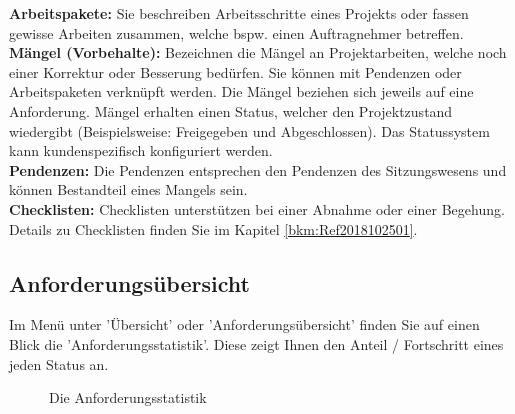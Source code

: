 \textbf{Arbeitspakete:} Sie beschreiben Arbeitsschritte eines Projekts oder fassen gewisse Arbeiten zusammen, welche bspw. einen Auftragnehmer betreffen. \\

\textbf{Mängel (Vorbehalte):} Bezeichnen die Mängel an Projektarbeiten, welche noch einer Korrektur oder Besserung bedürfen. Sie können mit Pendenzen oder Arbeitspaketen verknüpft werden. Die Mängel beziehen sich jeweils auf eine Anforderung. Mängel erhalten einen Status, welcher den Projektzustand wiedergibt (Beispielsweise: Freigegeben und Abgeschlossen). Das Statussystem kann kundenspezifisch konfiguriert werden. \\

\textbf{Pendenzen:} Die Pendenzen entsprechen den Pendenzen des Sitzungswesens und können Bestandteil eines Mangels sein. \\

\textbf{Checklisten:} Checklisten unterstützen bei einer Abnahme oder einer Begehung. Details zu Checklisten finden Sie im Kapitel \ref{bkm:Ref2018102501}.

\subsection{Anforderungsübersicht}

Im Menü unter 'Übersicht' oder 'Anforderungsübersicht' finden Sie auf einen Blick die 'Anforderungsstatistik'. Diese zeigt Ihnen den Anteil / Fortschritt eines jeden Status an.

\begin{figure}[H]
\caption{Die Anforderungsstatistik}
\end{figure}

